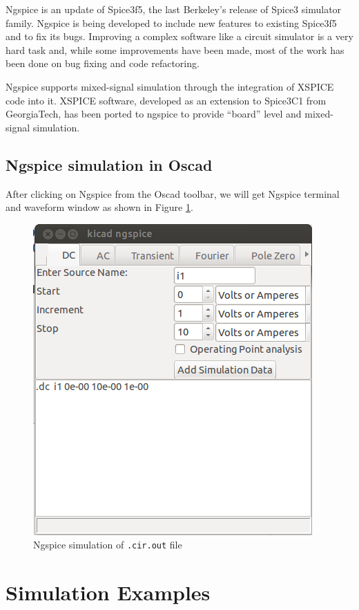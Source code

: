 Ngspice is an update of Spice3f5, the last Berkeley’s release of Spice3 simulator family. Ngspice is being developed to include new features to existing Spice3f5 and to fix its bugs. Improving a complex software like a circuit simulator is a very hard task and, while some improvements have been made, most of the work has been done on bug fixing and code refactoring. 

Ngspice supports mixed-signal simulation through the integration of XSPICE code into it. XSPICE software, developed as an extension to Spice3C1 from GeorgiaTech, has been ported to ngspice to provide “board” level and mixed-signal simulation.
\subsection{Ngspice simulation in Oscad}
After clicking on Ngspice from the Oscad toolbar, we will get Ngspice terminal and waveform window as shown in Figure \ref{12}.
\begin{figure}
\centering
\includegraphics[width=\textwidth]{figures/12}
\caption{Ngspice simulation of {\tt .cir.out} file}
\label{12}
\end{figure}
\section{Simulation Examples}
